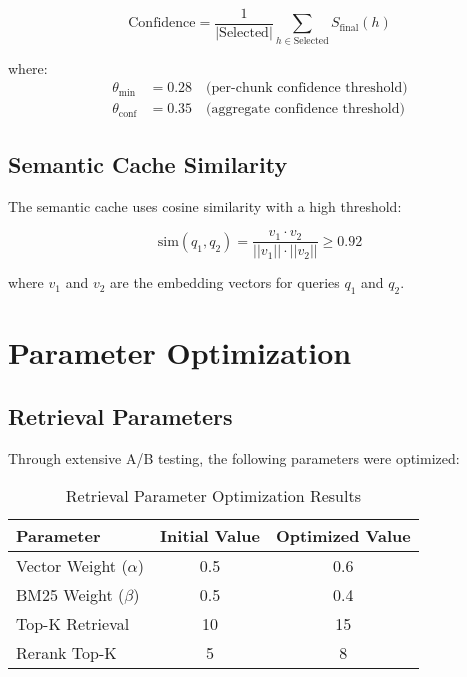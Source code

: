 \documentclass[11pt,a4paper]{article}
\begin{document}
\begin{equation}
\text{Confidence} = \frac{1}{|\text{Selected}|} \sum_{h \in \text{Selected}} S_{\text{final}}(h)
\end{equation}

where:
\begin{align}
\theta_{\text{min}} &= 0.28 \quad \text{(per-chunk confidence threshold)}\\
\theta_{\text{conf}} &= 0.35 \quad \text{(aggregate confidence threshold)}
\end{align}

\subsection{Semantic Cache Similarity}

The semantic cache uses cosine similarity with a high threshold:

\begin{equation}
\text{sim}(q_1, q_2) = \frac{v_1 \cdot v_2}{||v_1|| \cdot ||v_2||} \geq 0.92
\end{equation}

where $v_1$ and $v_2$ are the embedding vectors for queries $q_1$ and $q_2$.

\section{Parameter Optimization}

\subsection{Retrieval Parameters}

Through extensive A/B testing, the following parameters were optimized:

\begin{table}[h]
\centering
\begin{tabular}{@{}lcc@{}}
\toprule
Parameter & Initial Value & Optimized Value \\
\midrule
Vector Weight ($\alpha$) & 0.5 & 0.6 \\
BM25 Weight ($\beta$) & 0.5 & 0.4 \\
Top-K Retrieval & 10 & 15 \\
Rerank Top-K & 5 & 8 \\
\bottomrule
\end{tabular}
\caption{Retrieval Parameter Optimization Results}
\end{table}
\end{document}
